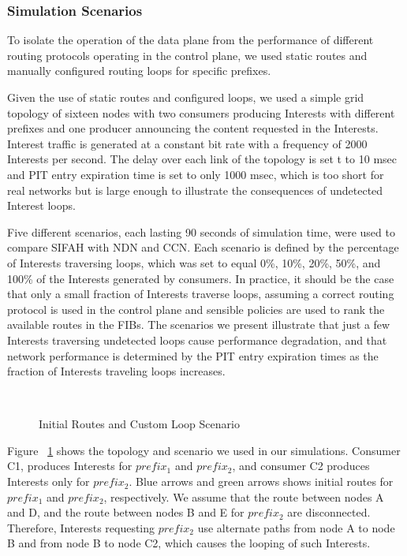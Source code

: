 \documentclass{ancs15-alternate}
\begin{document}
\subsubsection{Simulation Scenarios}

To isolate the operation of the data plane from the performance of different routing protocols operating in the control plane, we used  static routes and  manually configured routing loops for specific prefixes. 

Given the use of static routes and configured loops, we used a simple grid topology of sixteen nodes with two consumers producing Interests with different prefixes and one producer announcing the  content requested in the Interests. Interest traffic is generated at a constant bit rate with a frequency of 2000 Interests per second. The delay over each link of the topology is set t to 10 msec  and PIT entry expiration time is set to only 1000 msec, which is too short for real networks but is large enough to illustrate the consequences of undetected Interest loops.  

Five different scenarios, each lasting  90 seconds of simulation time,
were used to compare SIFAH with NDN and CCN. Each scenario is defined by the percentage of Interests traversing loops, which was set to equal 
0\%, 10\%, 20\%, 50\%, and 100\%  of the Interests generated by consumers.
In practice, it should be the case that  only a small fraction of Interests traverse loops, assuming a correct routing protocol is used in the control plane and sensible policies are used to rank the available routes in the FIBs.
The scenarios we present illustrate that 
just a few Interests traversing undetected loops cause performance degradation, and that network performance is determined by the PIT entry expiration times as the fraction of Interests traveling loops increases.

\begin{figure}[h]
\begin{centering}
    \mbox{
      }
 \vspace{-0.1in}
   \caption{Initial Routes and Custom Loop Scenario}
   \label{loop}
\end{centering} 
\end{figure} 

Figure ~\ref{loop} shows the topology and scenario we used in our simulations. Consumer C1, produces Interests for $prefix_1$ and $prefix_2$, and consumer C2 produces Interests only for $prefix_2$. Blue arrows and green arrows shows initial routes for $prefix_1$ and $prefix_2$, respectively. We assume that the route between nodes A and D, and the route between nodes B and E for $prefix_2$ are disconnected. Therefore, Interests requesting $prefix_2$ use alternate paths from node A to node B and from node B to node C2, which causes the looping of such Interests.
\end{document}
